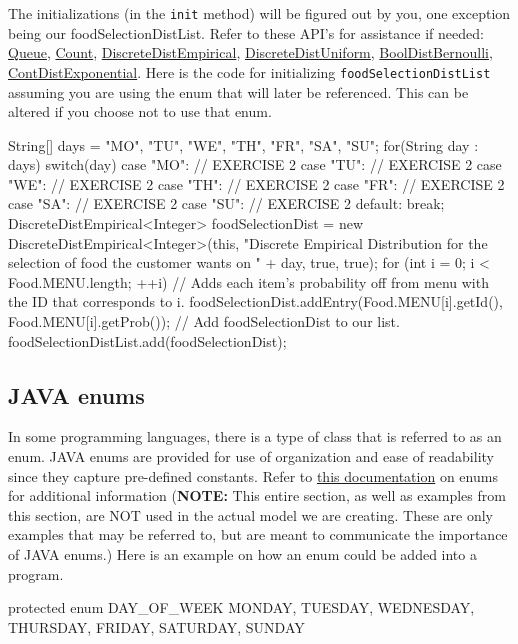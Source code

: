 \documentclass[11pt]{article}
\newcommand{\code}[1]{\texttt{#1}}
\newcommand{\method}[1]{\texttt{#1}}
\begin{document}
The initializations (in the \method{init} method) will be figured out by you, one exception being our foodSelectionDistList. Refer to these API's for assistance if needed:
\href{http://desmoj.sourceforge.net/doc/desmoj/core/simulator/Queue.html}{Queue}, \href{http://desmoj.sourceforge.net/doc/desmoj/core/statistic/Count.html}{Count}, \href{http://desmoj.sourceforge.net/doc/desmoj/core/dist/DiscreteDistEmpirical.html}{DiscreteDistEmpirical}, \href{http://desmoj.sourceforge.net/doc/desmoj/core/dist/DiscreteDistUniform.html}{DiscreteDistUniform}, \href{http://desmoj.sourceforge.net/doc/desmoj/core/dist/BoolDistBernoulli.html}{BoolDistBernoulli}, \href{http://desmoj.sourceforge.net/doc/desmoj/core/dist/ContDistExponential.html}{ContDistExponential}.
\newline
Here is the code for initializing \code{foodSelectionDistList} assuming you are using the enum that will later be referenced. This can be altered if you choose not to use that enum.
\begin{java}
String[] days = {"MO", "TU", "WE", "TH", "FR", "SA", "SU"};
for(String day : days)
	{
		switch(day)
		{
		case "MO":
			// EXERCISE 2
		case "TU":
			// EXERCISE 2
		case "WE":
			// EXERCISE 2
		case "TH":
			// EXERCISE 2
		case "FR":
			// EXERCISE 2
		case "SA":
			// EXERCISE 2
		case "SU":
			// EXERCISE 2
		default: break;
		}
		DiscreteDistEmpirical<Integer> foodSelectionDist =
			new DiscreteDistEmpirical<Integer>(this, "Discrete Empirical Distribution for the selection of food the customer wants on " + day, true, true);
		for (int i = 0; i < Food.MENU.length; ++i)
		{
			// Adds each item's probability off from menu with the ID that corresponds to i.
			foodSelectionDist.addEntry(Food.MENU[i].getId(), Food.MENU[i].getProb());
		}
		// Add foodSelectionDist to our list.
		foodSelectionDistList.add(foodSelectionDist);
	}
\end{java}
\subsection*{JAVA enums}
In some programming languages, there is a type of class that is referred to as an enum. JAVA enums are provided for use of organization and ease of readability since they capture pre-defined constants. Refer to \href{https://docs.oracle.com/javase/7/docs/api/java/lang/Enum.html}{this documentation} on enums for additional information
\newline
(\textbf{NOTE:} This entire section, as well as examples from this section, are NOT used in the actual model we are creating. These are only examples that may be referred to, but are meant to communicate the importance of JAVA enums.)
\newline
Here is an example on how an enum could be added into a program.
\pagebreak
\begin{java}
protected enum DAY_OF_WEEK
{
	MONDAY, TUESDAY, WEDNESDAY, THURSDAY, FRIDAY, SATURDAY, SUNDAY
}
\end{java}
\end{document}
